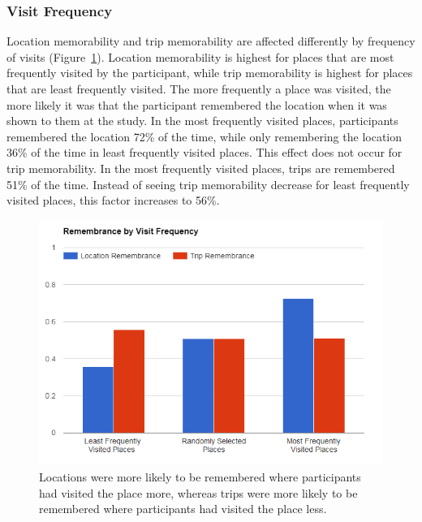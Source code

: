 \documentclass{sigchi}
\begin{document}
\subsubsection{Visit Frequency}
Location memorability and trip memorability are affected differently by frequency of visits (Figure~\ref{fig:frequencymemory}). Location memorability is highest for places that are most frequently visited by the participant, while trip memorability is highest for places that are least frequently visited. The more frequently a place was visited, the more likely it was that the participant remembered the location when it was shown to them at the study. In the most frequently visited places, participants remembered the location 72\% of the time, while only remembering the location 36\% of the time in least frequently visited places. This effect does not occur for trip memorability. In the most frequently visited places, trips are remembered 51\% of the time. Instead of seeing trip memorability decrease for least frequently visited places, this factor increases to 56\%.

\begin{figure}
   \centering
     \includegraphics[width=1\linewidth]{RML_2}
     \caption{Locations were more likely to be remembered where participants had visited the place more, whereas trips were more likely to be remembered where participants had visited the place less.}
     \label{fig:frequencymemory}
\end{figure}
\end{document}
